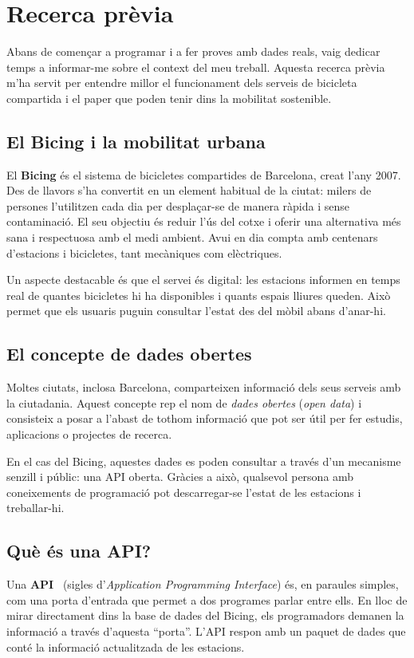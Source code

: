 \chapter{Recerca prèvia}
\label{c:recerca previa}

Abans de començar a programar i a fer proves amb dades reals, vaig dedicar temps a informar-me sobre el context del meu treball. Aquesta recerca prèvia m’ha servit per entendre millor el funcionament dels serveis de bicicleta compartida i el paper que poden tenir dins la mobilitat sostenible.

\section{El Bicing i la mobilitat urbana}
El \textbf{Bicing} és el sistema de bicicletes compartides de Barcelona, creat l’any 2007. Des de llavors s’ha convertit en un element habitual de la ciutat: milers de persones l’utilitzen cada dia per desplaçar-se de manera ràpida i sense contaminació. El seu objectiu és reduir l’ús del cotxe i oferir una alternativa més sana i respectuosa amb el medi ambient. Avui en dia compta amb centenars d’estacions i bicicletes, tant mecàniques com elèctriques.

Un aspecte destacable és que el servei és digital: les estacions informen en temps real de quantes bicicletes hi ha disponibles i quants espais lliures queden. Això permet que els usuaris puguin consultar l’estat des del mòbil abans d’anar-hi.

\section{El concepte de dades obertes}
Moltes ciutats, inclosa Barcelona, comparteixen informació dels seus serveis amb la ciutadania. Aquest concepte rep el nom de \textit{dades obertes} (\textit{open data}) i consisteix a posar a l’abast de tothom informació que pot ser útil per fer estudis, aplicacions o projectes de recerca.

En el cas del Bicing, aquestes dades es poden consultar a través d’un mecanisme senzill i públic: una API oberta. Gràcies a això, qualsevol persona amb coneixements de programació pot descarregar-se l’estat de les estacions i treballar-hi.

\section{Què és una API?}
Una \textbf{API}~\cite{api-def} (sigles d’\textit{Application Programming Interface}) és, en paraules simples, com una porta d’entrada que permet a dos programes parlar entre ells. En lloc de mirar directament dins la base de dades del Bicing, els programadors demanen la informació a través d’aquesta “porta”. L’API respon amb un paquet de dades que conté la informació actualitzada de les estacions.


